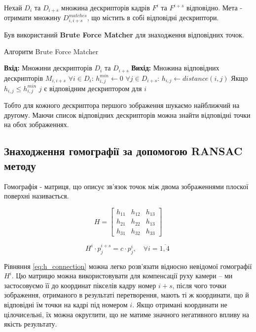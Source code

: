 Нехай $D_i$ та $D_{i+s}$ множина дескрипторів кадрів \(F^{i}\) та \(F^{i + s}\)
відповідно. Мета - отримати множину $D^{matches}_{i,i+s}$, що містить в собі відповідні дескриптори.


Був використаний \textbf{Brute Force Matcher} для знаходження відповідних точок.
\begin{algorithm}[H]
    \caption{Алгоритм Brute Force Matcher}
    \begin{algorithmic}
    \State \textbf{Вхід:} Множини дескрипторів $D_i$ та $D_{i+s}$
    \State \textbf{Вихід:} Множина відповідних дескрипторів $M_{i,i+s}$
    \State $\forall i \in D_i$:
    \State  \qquad $h^{min}_{i,j} \gets 0$
    \State  \qquad  $\forall j \in D_{i+s}$:
    \State  \qquad \qquad  $h_{i,j} \gets distance(i,j)$
    \State  \qquad \qquad  Якщо {$h_{i,j} \leq h^{min}_{i,j}$} 
    \State  \qquad \qquad  \qquad $j$ є відповідним  дескриптором для $i$    
    \end{algorithmic}
\end{algorithm}

Тобто для кожного дескриптора першого зображення шукаємо найближчий на другому.
Маючи список відповідних дескрипторів можна знайти відповідні точки на обох зображеннях.

\subsection{Знаходження гомографії за допомогою RANSAC методу}

Гомографія - матриця, що описує зв'язок точок між двома зображеннями плоскої поверхні 
називається.

\begin{equation}
    H = 
    \begin{bmatrix}
        h_{11} & h_{12} & h_{13}\\
        h_{21} & h_{22} & h_{13}\\
        h_{31} & h_{32} & h_{33}
        \end{bmatrix}
    \label{eq:h_matrix}
\end{equation}

\begin{equation}
    H^{i} \cdot p_{j}^{i + s} = c \cdot p_{j}^{i},\quad\forall i = \overline{1,4\ }
    \label{eq:h_connection}
\end{equation}


Рівняння \ref{eq:h_connection} можна легко розв'язати відносно невідомої гомографії
\(H^{i}\). Цю матрицю можна використовувати для компенсації руху камери
-- ми застосовуємо її до координат пікселів кадру номер \(i + s\), після
чого точки зображення, отриманого в результаті перетворення, мають ті ж
координати, що й відповідні їм точки на кадрі під номером \(i\). Якщо
отримані координати не цілочисельні, їх можна округлити, що не матиме
значного негативного впливу на якість результату.

